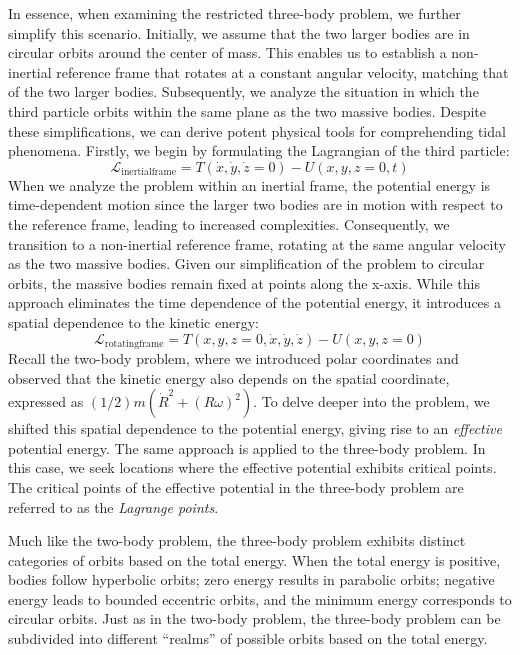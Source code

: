 In essence, when examining the restricted three-body problem, we further simplify this scenario. Initially, we assume that the two larger bodies are in circular orbits around the center of mass. This enables us to establish a non-inertial reference frame that rotates at a constant angular velocity, matching that of the two larger bodies. Subsequently, we analyze the situation in which the third particle orbits within the same plane as the two massive bodies. Despite these simplifications, we can derive potent physical tools for comprehending tidal phenomena. Firstly, we begin by formulating the Lagrangian of the third particle:
\begin{equation}
    \mathcal{L}_{\mathrm{inertial frame}} = T(\dot{x},\dot{y},\dot{z}=0)-U(x,y,z=0,t)
\end{equation}
When we analyze the problem within an inertial frame, the potential energy is time-dependent motion since the larger two bodies are in motion with respect to the reference frame, leading to increased complexities. Consequently, we transition to a non-inertial reference frame, rotating at the same angular velocity as the two massive bodies. Given our simplification of the problem to circular orbits, the massive bodies remain fixed at points along the x-axis. While this approach eliminates the time dependence of the potential energy, it introduces a spatial dependence to the kinetic energy:
\begin{equation}
    \mathcal{L}_{\mathrm{rotating frame}} = T(x,y,z=0,\dot{x},\dot{y},\dot{z})-U(x,y,z=0)
\end{equation}
Recall the two-body problem, where we introduced polar coordinates and observed that the kinetic energy also depends on the spatial coordinate, expressed as $(1/2)m\left(\dot{R}^2 +(R\omega)^2 \right)$. To delve deeper into the problem, we shifted this spatial dependence to the potential energy, giving rise to an \textit{effective} potential energy. The same approach is applied to the three-body problem. In this case, we seek locations where the effective potential exhibits critical points. The critical points of the effective potential in the three-body problem are referred to as the \textit{Lagrange points}.


Much like the two-body problem, the three-body problem exhibits distinct categories of orbits based on the total energy. When the total energy is positive, bodies follow hyperbolic orbits; zero energy results in parabolic orbits; negative energy leads to bounded eccentric orbits, and the minimum energy corresponds to circular orbits. Just as in the two-body problem, the three-body problem can be subdivided into different ``realms'' of possible orbits based on the total energy.

